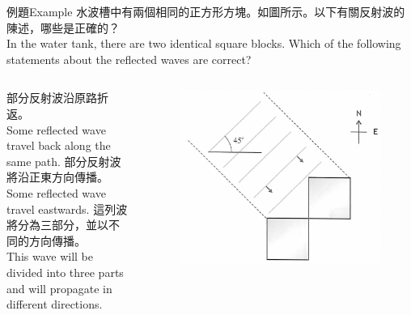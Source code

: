 \documentclass[beamer=true]{standalone}
\begin{document}
\begin{frame}{例題Example}
    水波槽中有兩個相同的正方形方塊。如圖所示。以下有關反射波的陳述，哪些是正確的？\\In the water tank, there are two identical square blocks. Which of the following statements about the reflected waves are correct?
    \begin{columns}
        \begin{statements}[before-skip=0.2em,item-indent=3em,label-offset=1em]
            \task 部分反射波沿原路折返。\\Some reflected wave travel back along the same path.
            \task 部分反射波將沿正東方向傳播。\\Some reflected wave travel eastwards.
            \task 這列波將分為三部分，並以不同的方向傳播。\\This wave will be divided into three parts and will propagate in different directions.
        \end{statements}
        \begin{figure}
            \centering
            \includegraphics[width=1\linewidth]{images/Screenshot 2023-09-27 at 5.38.43 PM.png}
        \end{figure}
    \end{columns}
\end{frame}
\end{document}
